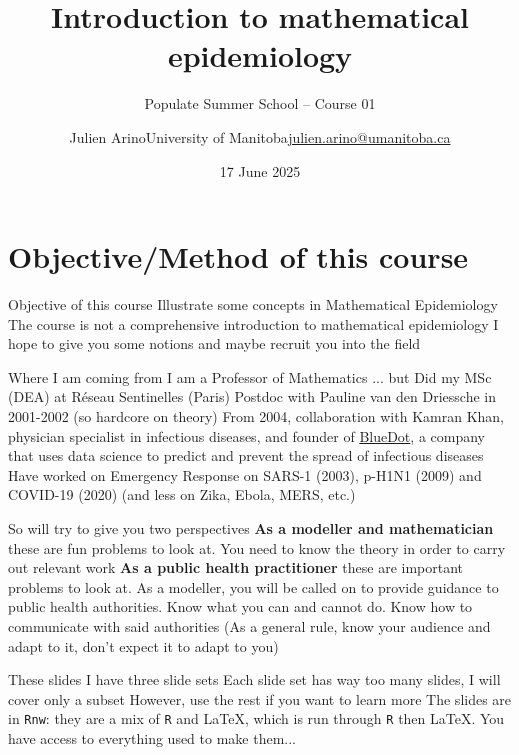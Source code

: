 \documentclass[aspectratio=169]{beamer}\usepackage[]{graphicx}\usepackage[]{xcolor}
\title{Introduction to mathematical epidemiology}
\subtitle{Populate Summer School -- Course 01}
\date{17 June 2025}
\author{\texorpdfstring{Julien Arino\newline University of Manitoba\newline\url{julien.arino@umanitoba.ca}}{Julien Arino}}
\begin{document}


\section*{Objective/Method of this course}

\begin{frame}{Objective of this course}
\bbullet
Illustrate some concepts in Mathematical Epidemiology
\vfill
\bbullet The course is not a comprehensive introduction to mathematical epidemiology
\vfill
\bbullet I hope to give you some notions and maybe recruit you into the field
\end{frame}

\begin{frame}{Where I am coming from}
\bbullet I am a Professor of Mathematics ... but
\vfill
\bbullet Did my MSc (DEA) at R\'eseau Sentinelles (Paris)
\vfill
\bbullet Postdoc with Pauline van den Driessche in 2001-2002 (so hardcore on theory)
\vfill
\bbullet From 2004, collaboration with Kamran Khan, physician specialist in infectious diseases, and founder of \href{https://www.blue-dot.global/}{BlueDot}, a company that uses data science to predict and prevent the spread of infectious diseases
\vfill
\bbullet Have worked on Emergency Response on SARS-1 (2003), p-H1N1 (2009) and COVID-19 (2020) (and less on Zika, Ebola, MERS, etc.)
\end{frame}

\begin{frame}{So will try to give you two perspectives}
\bbullet\textbf{As a modeller and mathematician} these are fun problems to look at. You need to know the theory in order to carry out relevant work
\vfill
\bbullet\textbf{As a public health practitioner} these are important problems to look at.
As a modeller, you will be called on to provide guidance to public health authorities. Know what you can and cannot do. Know how to communicate with said authorities
\vfill
\bbullet (As a general rule, know your audience and adapt to it, don't expect it to adapt to you)
\end{frame}

\begin{frame}{These slides}
\bbullet I have three slide sets
\vfill
\bbullet Each slide set has way too many slides, I will cover only a subset
\vfill
\bbullet However, use the rest if you want to learn more
\vfill
\bbullet The slides are in \texttt{Rnw}: they are a mix of \texttt{R} and \LaTeX, which is run through \texttt{R} then \LaTeX. You have access to everything used to make them...
\end{frame}
\end{document}
